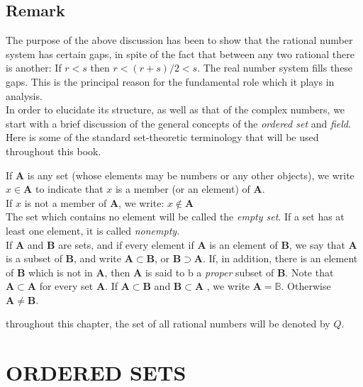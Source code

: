 \subsection*{\textbf{Remark}}
The purpose of the above discussion has been to show that the rational number system has certain gaps, in spite 
of the fact that between any two rational there is another: If $r<s$ then $r<(r+s)/2<s$. The real number system
fills these gaps. This is the principal reason for the fundamental role which it plays in analysis.\\
\indent In order to elucidate its structure, as well as that of the complex numbers, we start with a brief
 discussion of the general concepts of the \textit{ordered set} and \textit{field}.\\
 \indent Here is some of the standard set-theoretic terminology that will be used throughout this book.

 \begin{definition}
    If $\mathbf{A}$ is any set (whose elements may be numbers or any other objects), we write $x \in \mathbf{A}$
    to indicate that $x$ is a member (or an element) of $\mathbf{A}$.\\
    \indent If $x$ is not a member of $\mathbf{A}$, we write: $x \notin \mathbf{A}$\\
    \indent The set which contains no element will be called the \textit{empty set}. If a set has at least 
    one element, it is called \textit{nonempty}.\\
    \indent If $\mathbf{A}$ and $\mathbf{B}$ are sets, and if every element if $\mathbf{A}$ is an element of $\mathbf{B}$,
    we say that $\mathbf{A}$ is a subset of $\mathbf{B}$, and write $\mathbf{A} \subset \mathbf{B}$, or 
    $\mathbf{B} \supset \mathbf{A}$. If, in addition, there is an element of $\mathbf{B}$ which is not in 
    $\mathbf{A}$, then $\mathbf{A}$ is said to b a \textit{proper } subset of $\mathbf{B}$. Note 
    that $\mathbf{A} \subset \mathbf{A}$ for every set $\mathbf{A}$.
    \indent If $\mathbf{A} \subset \mathbf{B}$ and $\mathbf{B} \subset \mathbf{A}$ , we write $\mathbf{A}=\mathbb{B}$. Otherwise 
    $\mathbf{A} \neq \mathbf{B}$.
\end{definition}

\begin{definition}
    throughout this chapter, the set of all rational numbers will be denoted by $\mathit{Q}$.
\end{definition}

\section*{\textbf{ORDERED SETS}}

